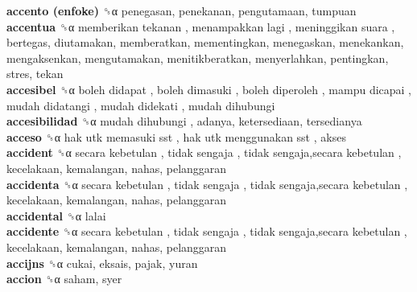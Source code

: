 \textbf{accento (enfoke)} ␝α  penegasan, penekanan, pengutamaan, tumpuan  \\
\textbf{accentua} ␝α   memberikan tekanan ,  menampakkan lagi ,  meninggikan suara , bertegas, diutamakan, memberatkan, mementingkan, menegaskan, menekankan, mengaksenkan, mengutamakan, menitikberatkan, menyerlahkan, pentingkan, stres, tekan  \\
\textbf{accesibel} ␝α   boleh didapat ,  boleh dimasuki ,  boleh diperoleh ,  mampu dicapai ,  mudah didatangi ,  mudah didekati ,  mudah dihubungi   \\
\textbf{accesibilidad} ␝α   mudah dihubungi , adanya, ketersediaan, tersedianya  \\
\textbf{acceso} ␝α   hak utk memasuki sst ,  hak utk menggunakan sst , akses  \\
\textbf{accident} ␝α   secara kebetulan ,  tidak sengaja ,  tidak sengaja,secara kebetulan , kecelakaan, kemalangan, nahas, pelanggaran  \\
\textbf{accidenta} ␝α   secara kebetulan ,  tidak sengaja ,  tidak sengaja,secara kebetulan , kecelakaan, kemalangan, nahas, pelanggaran  \\
\textbf{accidental} ␝α  lalai  \\
\textbf{accidente} ␝α   secara kebetulan ,  tidak sengaja ,  tidak sengaja,secara kebetulan , kecelakaan, kemalangan, nahas, pelanggaran  \\
\textbf{accijns} ␝α  cukai, eksais, pajak, yuran  \\
\textbf{accion} ␝α  saham, syer  \\
